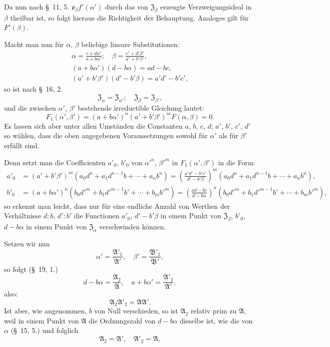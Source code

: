 \documentclass{article}
\begin{document}
Da nun nach §~11, 5. $\mathfrak{o}_{\beta}f'(\alpha')$ durch das von $\mathfrak{Z}_{\beta}$ erzeugte Verzweigungsideal in $\beta$ theilbar ist, so folgt hieraus die Richtigkeit der Behauptung. Analoges gilt für $F'(\beta)$.

Macht man nun für $\alpha$, $\beta$ beliebige lineare Substitutionen:
\[ \begin{gathered} \alpha = \frac{c+d\alpha'}{a+b\alpha'}; \quad \beta = \frac{c'+d'\beta'}{a'+b'\beta'}, \\ (a+b\alpha')(d-b\alpha) = ad-bc, \\ (a'+b'\beta')(d'-b'\beta) = a'd'-b'c', \end{gathered} \]
so ist nach §~16, 2.
\[ \mathfrak{Z}_{\alpha} = \mathfrak{Z}_{\alpha'}; \quad \mathfrak{Z}_{\beta} = \mathfrak{Z}_{\beta'}, \]
und die zwischen $\alpha'$, $\beta'$ bestehende irreductible Gleichung lautet:
\[ F_{1}(\alpha', \beta') = (a+b\alpha')^{n}(a'+b'\beta')^{m}F(\alpha, \beta) = 0. \]
Es lassen sich aber unter allen Umständen die Constanten $a$, $b$, $c$, $d$; $a'$, $b'$, $c'$, $d'$ so wählen, dass die oben angegebenen Voraussetzungen sowohl für $\alpha'$ als für $\beta'$ erfüllt sind.

Denn setzt man die Coefficienten $a'_{0}$, $b'_{0}$ von $\alpha'^{n}$, $\beta'^{m}$ in $F_{1}(\alpha', \beta')$ in die Form
\[ \begin{aligned} a'_{0} &= (a'+b'\beta')^{m}(a_{0}d^{n} + a_{1}d^{n-1}b + \cdots + a_{n}b^{n}) = \left(\frac{a'd'-b'c'}{d'-b'\beta}\right)^{m}(a_{0}d^{n} + a_{1}d^{n-1}b + \cdots + a_{n}b^{n}), \\ b'_{0} &= (a+b\alpha')^{n}(b_{0}d'^{m} + b_{1}d'^{m-1}b' + \cdots + b_{m}b'^{m}) = \left(\frac{ad-bc}{d-b\alpha}\right)^{n}(b_{0}d'^{m} + b_{1}d'^{m-1}b' + \cdots + b_{m}b'^{m}), \end{aligned} \]
so erkennt man leicht, dass nur für eine endliche Anzahl von Werthen der Verhältnisse $d : b$, $d' : b'$ die Functionen $a'_{0}$, $d'-b'\beta$ in einem Punkt von $\mathfrak{Z}_{\beta}$, $b'_{0}$, $d-b\alpha$ in einem Punkt von $\mathfrak{Z}_{\alpha}$ verschwinden können.

Setzen wir nun
\[ \alpha' = \frac{\mathfrak{A}'_{1}}{\mathfrak{A}'}, \quad \beta' = \frac{\mathfrak{B}'_{1}}{\mathfrak{B}'}, \]
so folgt (§~19, 1.)
\[ d-b\alpha = \frac{\mathfrak{A}_{2}}{\mathfrak{A}}, \quad a+b\alpha' = \frac{\mathfrak{A}'_{2}}{\mathfrak{A}'}, \]
also:
\[ \mathfrak{A}_{2}\mathfrak{A}'_{2} = \mathfrak{A}\mathfrak{A}'. \]
Ist aber, wie angenommen, $b$ von Null verschieden, so ist $\mathfrak{A}_{2}$ relativ prim zu $\mathfrak{A}$, weil in einem Punkt von $\mathfrak{A}$ die Ordnungszahl von $d-b\alpha$ dieselbe ist, wie die von $\alpha$ (§~15, 5.) und folglich
\[ \mathfrak{A}_{2} = \mathfrak{A}', \quad \mathfrak{A}'_{2} = \mathfrak{A}, \]
\end{document}
